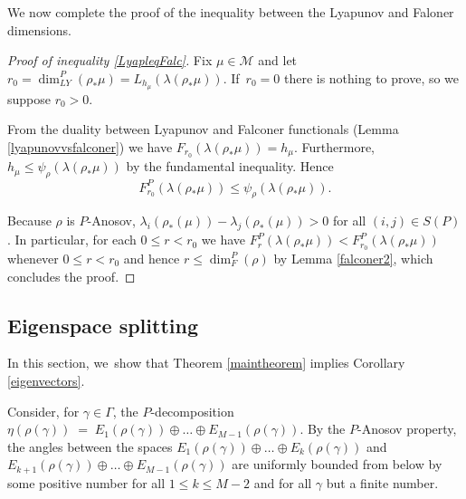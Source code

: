 \documentclass[JEP,XML,SOM,Unicode,NoEqCountersInSection,published]{cedram}
\let\G\Gamma
\let\g\gamma
\let\la\lambda
\begin{document}
We now complete the proof of the inequality between the Lyapunov and Faloner dimensions.

\begin{proof}[Proof of inequality \eqref{LyapleqFalc}]
Fix \(\mu \!\in\! \mathcal{M}\) and let \(r_0 \!=\! \dim_{LY}^P(\rho_\ast \mu) \!=\! L_{h_\mu}(\lambda(\rho_*\mu))\). If~\hbox{\(r_0 = 0\)} there is nothing to prove, so we suppose \(r_0 > 0\).

From the duality between Lyapunov and Falconer functionals (Lemma \ref{lyapunovvsfalconer}) we have
\(F_{r_0}(\lambda(\rho_*\mu)) = h_\mu\). Furthermore, \(h_\mu \le \psi_{\rho}(\lambda(\rho_{*}\mu)) \) by the fundamental inequality. Hence
\[
F_{r_0}^P(\la(\rho_*\mu)) \le \psi_\rho (\la(\rho_*\mu)).
\]

Because \(\rho\) is \(P\)-Anosov, \(\lambda_i(\rho_*(\mu)) - \lambda_j(\rho_*(\mu)) > 0\) for all \((i,j) \in S(P)\). In particular, for each \(0\le r < r_0\) we have \(F_{r}^P(\la(\rho_*\mu)) < F_{r_0}^P(\la(\rho_*\mu))\) whenever \(0 \le r < r_0\) and hence
\(r \le \dim_F^P(\rho) \) by Lemma \ref{falconer2}, which concludes the proof.
\end{proof}

\subsection{Eigenspace splitting}\label{splitting}

In this section, we~show that Theorem \ref{maintheorem} implies Corollary \ref{eigenvectors}.

Consider, for \(\g \in \G\), the \(P\)-decomposition \(\eta (\rho (\g)) \; = \; E_1(\rho (\g)) \oplus \ldots \oplus E_{M-1} (\rho (\g)) \).
By the \(P\)-Anosov property, the angles between the spaces \(E_1(\rho (\g)) \oplus \ldots \oplus E_{k}(\rho (\g)) \) and \(E_{k+1}(\rho (\g)) \oplus \ldots \oplus E_{M-1}(\rho (\g)) \) are uniformly bounded from below by some positive number for all \(1\le k \le M-2\) and for all \(\g\) but a finite number.
\end{document}
